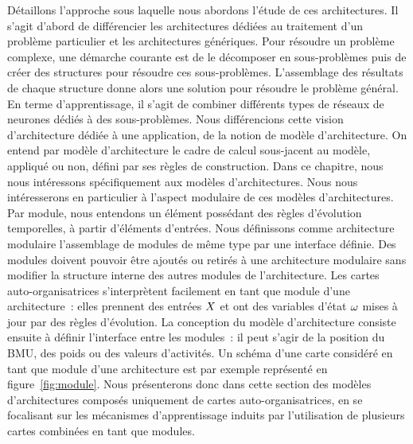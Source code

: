 \documentclass[../main]{subfiles}
\begin{document}
Détaillons l'approche sous laquelle nous abordons l'étude de ces architectures.
Il s'agit d'abord de différencier les architectures dédiées au traitement d'un problème particulier et les architectures génériques. Pour résoudre un problème complexe, une démarche courante est de le décomposer en sous-problèmes puis de créer des structures pour résoudre ces sous-problèmes. L'assemblage des résultats de chaque structure donne alors une solution pour résoudre le problème général. En terme d'apprentissage, il s'agit de combiner différents types de réseaux de neurones dédiés à des sous-problèmes.
Nous différencions cette vision d'architecture dédiée à une application, de la notion de modèle d'architecture.
On entend par modèle d'architecture le cadre de calcul sous-jacent au modèle, appliqué ou non, défini par ses règles de construction. Dans ce chapitre, nous nous intéressons spécifiquement aux modèles d'architectures.
Nous nous intéresserons en particulier à l'aspect modulaire de ces modèles d'architectures.
Par module, nous entendons un élément possédant des règles d'évolution temporelles, à partir d'éléments d'entrées. Nous définissons comme architecture modulaire l'assemblage de modules de même type par une interface définie. Des modules doivent pouvoir être ajoutés ou retirés à une architecture modulaire sans modifier la structure interne des autres modules de l'architecture.
Les cartes auto-organisatrices s'interprètent facilement en tant que module d'une architecture~: elles prennent des entrées $X$ et ont des variables d'état $\omega$ mises à jour par des règles d'évolution. La conception du modèle d'architecture consiste ensuite à définir l'interface entre les modules~: il peut s'agir de la position du BMU, des poids ou des valeurs d'activités.
Un schéma d'une carte considéré en tant que module d'une architecture est par exemple représenté en figure~\ref{fig:module}.
Nous présenterons donc dans cette section des modèles d'architectures composés uniquement de cartes auto-organisatrices, en se focalisant sur les mécanismes d'apprentissage induits par l'utilisation de plusieurs cartes combinées en tant que modules.
\end{document}
